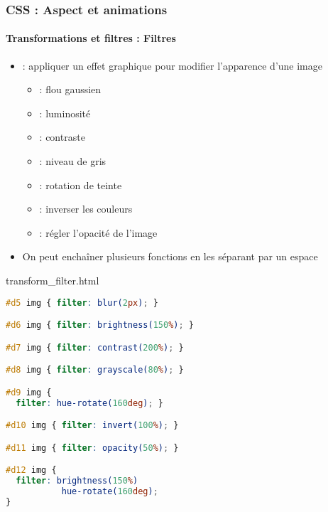 \documentclass[xcolor=table]{beamer}
\begin{document}
\begin{frame}[fragile]
\frametitle{CSS : Aspect et animations}
\framesubtitle{Transformations et filtres : Filtres}

\begin{minipage}{0.60\textwidth}
	\begin{itemize}
		\item {} : appliquer un effet graphique pour modifier l'apparence d'une image
		\begin{itemize}
			\item {} : flou gaussien
			\item {} : luminosité
			\item {} : contraste
			\item {} : niveau de gris
			\item {} : rotation de teinte
			\item {} : inverser les couleurs
			\item {} : régler l'opacité de l'image
		\end{itemize}
		\item On peut enchaîner plusieurs fonctions en les séparant par un espace
	\end{itemize}
\end{minipage}
%
\begin{minipage}{0.38\textwidth}
\begin{exampleblock}{transform\_filter.html}
\lstset{escapeinside=**}
\tiny\bfseries
\begin{lstlisting}[language={CSS}]
#d5 img { filter: blur(2px); }

#d6 img { filter: brightness(150%); }

#d7 img { filter: contrast(200%); }

#d8 img { filter: grayscale(80%); }

#d9 img { 
  filter: hue-rotate(160deg); }

#d10 img { filter: invert(100%); }

#d11 img { filter: opacity(50%); }

#d12 img { 
  filter: brightness(150%) 
           hue-rotate(160deg); 
}

\end{lstlisting}
\end{exampleblock}
\end{minipage}
\end{frame}
\end{document}
